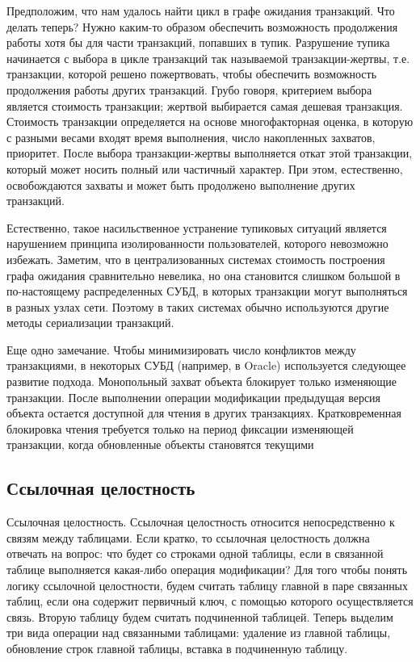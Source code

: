 Предположим, что нам удалось найти цикл в графе ожидания транзакций. Что делать теперь? Нужно каким-то образом обеспечить возможность продолжения работы хотя бы для части транзакций, попавших в тупик. Разрушение тупика начинается с выбора в цикле транзакций так называемой транзакции-жертвы, т.е. транзакции, которой решено пожертвовать, чтобы обеспечить возможность продолжения работы других транзакций. Грубо говоря, критерием выбора является стоимость транзакции; жертвой выбирается самая дешевая транзакция. Стоимость транзакции определяется на основе многофакторная оценка, в которую с разными весами входят время выполнения, число накопленных захватов, приоритет. После выбора транзакции-жертвы выполняется откат этой транзакции, который может носить полный или частичный характер. При этом, естественно, освобождаются захваты и может быть продолжено выполнение других транзакций.


Естественно, такое насильственное устранение тупиковых ситуаций является нарушением принципа изолированности пользователей, которого невозможно избежать. Заметим, что в централизованных системах стоимость построения графа ожидания сравнительно невелика, но она становится слишком большой в по-настоящему распределенных СУБД, в которых транзакции могут выполняться в разных узлах сети. Поэтому в таких системах обычно используются другие методы сериализации транзакций.


Еще одно замечание. Чтобы минимизировать число конфликтов между транзакциями, в некоторых СУБД (например, в Oracle) используется следующее развитие подхода. Монопольный захват объекта блокирует только изменяющие транзакции. После выполнении операции модификации предыдущая версия объекта остается доступной для чтения в других транзакциях. Кратковременная блокировка чтения требуется только на период фиксации изменяющей транзакции, когда обновленные объекты становятся текущими \autocite{Serial}

\subsection{Ссылочная целостность}

Ссылочная целостность. Ссылочная целостность относится непосредственно к связям между таблицами. Если кратко, то ссылочная целостность должна отвечать на вопрос: что будет со строками одной таблицы, если в связанной таблице выполняется какая-либо операция модификации? Для того чтобы понять логику ссылочной целостности, будем считать таблицу главной в паре связанных таблиц, если она содержит первичный ключ, с помощью которого осуществляется связь. Вторую таблицу будем считать подчиненной таблицей. Теперь выделим три вида операции над связанными таблицами: удаление из главной таблицы, обновление строк главной таблицы, вставка в подчиненную таблицу.

